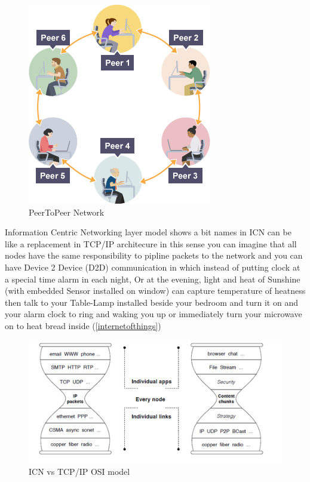 \begin{figure}[H]

\begin{center}

\includegraphics[scale = 0.4]{Pictures/peertopeer.png}

\caption{PeerToPeer Network} \label{peertopeer} 

\end{center}

\end{figure}



Information Centric Networking layer model shows a bit names in ICN can be like a replacement in TCP/IP architecure in this sense you can imagine that all nodes have the same responsibility to pipline packets to the network and you can have Device 2 Device (D2D) communication in which instead of putting clock at a special time alarm in each night, Or at the evening, light and heat of Sunshine (with embedded Sensor installed on window) can capture temperature of heatness then talk to your Table-Lamp installed beside your bedroom and turn it on and your alarm clock to ring and waking you up or immediately turn your microwave on to heat bread inside (\ref{internetofthings})



\begin{figure}[H]

\begin{center}

\includegraphics[scale = 0.6]{Pictures/spec.png}

\caption{ICN vs TCP/IP OSI model} \label{spec} 

\end{center}

\end{figure}

